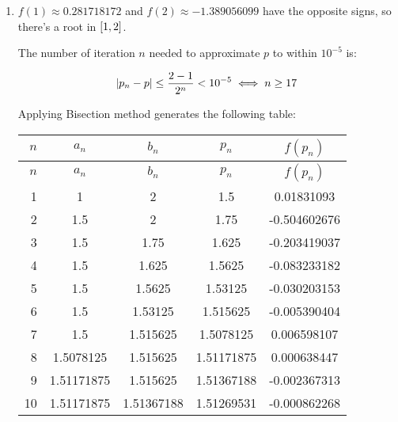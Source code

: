 \documentclass[../../Assignments.tex]{subfiles}
\begin{document}
\begin{solution}
    \begin{enumerate}[label = (\alph*)]
        \item \(f(1) \approx \num{0.281718172}\) and \(f(2) \approx
            \num{-1.389056099}\) have the opposite signs, so there's a root in
            \(\interval{1}{2}\).

            The number of iteration \(n\) needed to approximate \(p\) to within
            \(10^{-5}\) is:

            \[\abs{p_n - p} \leq \frac{2 - 1}{2^n} < 10^{-5} \iff n \geq 17\]

            Applying Bisection method generates the following table:

            \begin{longtable}{r S[table-format=1.8] S[table-format=1.8] S[table-format=1.8] S[table-format=-1.9]}
                \toprule
                \(n\)  &   {\(a_n\)}   &   {\(b_n\)}   &   {\(p_n\)}   &  {\(f(p_n)\)}  \\
                \midrule
                \endfirsthead
                \(n\)  &   {\(a_n\)}   &   {\(b_n\)}   &   {\(p_n\)}   &  {\(f(p_n)\)}  \\
                \midrule
                  &  1            &  2            &  1.5          &   0.01831093   \\
                    2  &  1.5          &  2            &  1.75         &  -0.504602676  \\
                    3  &  1.5          &  1.75         &  1.625        &  -0.203419037  \\
                    4  &  1.5          &  1.625        &  1.5625       &  -0.083233182  \\
                    5  &  1.5          &  1.5625       &  1.53125      &  -0.030203153  \\
                    6  &  1.5          &  1.53125      &  1.515625     &  -0.005390404  \\
                    7  &  1.5          &  1.515625     &  1.5078125    &   0.006598107  \\
                    8  &  1.5078125    &  1.515625     &  1.51171875   &   0.000638447  \\
                    9  &  1.51171875   &  1.515625     &  1.51367188   &  -0.002367313  \\
                   10  &  1.51171875   &  1.51367188   &  1.51269531   &  -0.000862268  \\

\end{longtable}
\end{enumerate}
\end{solution}
\end{document}
